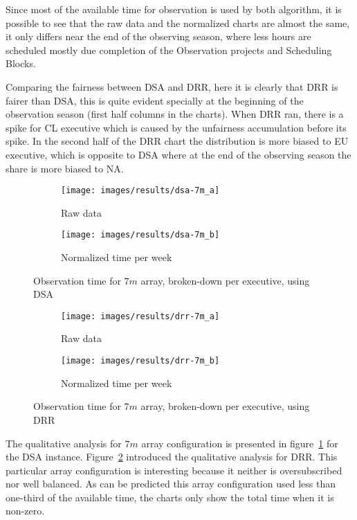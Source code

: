 Since most of the available time for observation is used by both algorithm, it is possible to see that the raw data and the normalized charts are almost the same, it only differs near the end of the observing season, where less hours are scheduled mostly due completion of the Observation projects and Scheduling Blocks.

Comparing the fairness between DSA and DRR, here it is clearly that DRR is fairer than DSA, this is quite evident specially at the beginning of the observation season (first half columns in the charts). When DRR ran, there is a spike for CL executive which is caused by the unfairness accumulation before its spike. In the second half of the DRR chart the distribution is more biased to EU executive, which is opposite to DSA where at the end of the observing season the share is more biased to NA.

\begin{figure}[t]
\centering
	\begin{subfigure}[b]{0.49\textwidth}
		\texttt{[image: images/results/dsa-7m\_a]}
        \caption{Raw data} 
    \end{subfigure} 
    \begin{subfigure}[b]{0.49\textwidth}
    		\texttt{[image: images/results/dsa-7m\_b]}
            \caption{Normalized time per week} 
    \end{subfigure}
    \caption{Observation time for $7m$ array, broken-down per executive, using DSA}
    \label{fig:dsa-7m-exec}
\end{figure}

\begin{figure}[t]
\centering
	\begin{subfigure}[b]{0.49\textwidth}
		\texttt{[image: images/results/drr-7m\_a]}
        \caption{Raw data} 
    \end{subfigure} 
    \begin{subfigure}[b]{0.49\textwidth}
    		\texttt{[image: images/results/drr-7m\_b]}
            \caption{Normalized time per week} 
    \end{subfigure}
    \caption{Observation time for $7m$ array, broken-down per executive, using DRR}
    \label{fig:drr-7m-exec}
\end{figure}

The qualitative analysis for $7m$ array configuration is presented in figure~\ref{fig:dsa-7m-exec} for the DSA instance. Figure~\ref{fig:drr-7m-exec} introduced the qualitative analysis for DRR. This particular array configuration is interesting because it neither is oversubscribed nor well balanced. As can be predicted this array configuration used less than one-third of the available time, the charts only show the total time when it is non-zero.

